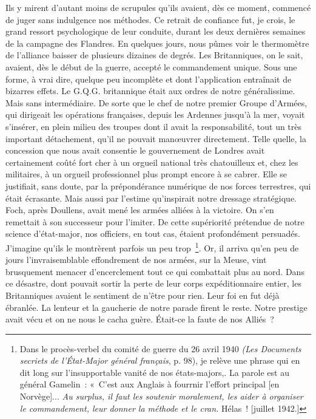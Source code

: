 \documentclass[french,twoside]{book} %
\begin{document}
Ils y mirent d’autant moins de scrupules qu’ils avaient, dès ce moment, commencé de juger sans indulgence nos méthodes. Ce retrait de confiance fut, je crois, le grand ressort psychologique de leur conduite, durant les deux dernières semaines de la campagne des Flandres. En quelques jours, nous pûmes voir le thermomètre de l’alliance baisser de   plusieurs dizaines de degrés. Les Britanniques, on le sait, avaient, dès le début de la guerre, accepté le commandement unique. Sous une forme, à vrai dire, quelque peu incomplète et dont l’application entraînait de bizarres effets. Le G.Q.G. britannique était aux ordres de notre généralissime. Mais sans intermédiaire. De sorte que le chef de notre premier Groupe d’Armées, qui dirigeait les opérations françaises, depuis les Ardennes jusqu’à la mer, voyait s’insérer, en plein milieu des troupes dont il avait la responsabilité, tout un très important détachement, qu’il ne pouvait manœuvrer directement. Telle quelle, la concession que nous avait consentie le gouvernement de Londres avait certainement coûté fort cher à un orgueil national très chatouilleux et, chez les militaires, à un orgueil professionnel plus prompt encore à se cabrer. Elle se justifiait, sans doute, par la prépondérance numérique de nos forces terrestres, qui était écrasante. Mais aussi par l’estime qu’inspirait notre dressage stratégique. Foch, après Doullens, avait mené les armées alliées à la victoire. On s’en remettait à son successeur pour l’imiter. De cette supériorité prétendue de notre science d’état-major, nos officiers, en tout cas, étaient profondément persuadés. J’imagine qu’ils le montrèrent parfois un peu trop \footnote{ Dans le procès-verbel du comité de guerre du 26 avril 1940 \emph{(Les Documents secriets de l’État-Major général français}, p. 98), je relève une phrase qui en dit long sur l’insupportable vanité de nos états-majors,. La parole est au général Gamelin : « C’est aux Anglais à fourrnir l’effort principal [en Norvège]... \emph{Au surplus, il faut les soutenir moralement, les aider à organiser le commandement, leur donner la méthode et le cran.} Hélas ! [juillet 1942.]}. Or, il arriva qu’en peu de jours l’invraisemblable effondrement de nos armées, sur la Meuse, vint brusquement menacer d’encerclement tout ce qui combattait plus au nord. Dans ce désastre, dont pouvait sortir la perte de leur corps   expéditionnaire entier, les Britanniques avaient le sentiment de n’être pour rien. Leur foi en fut déjà ébranlée. La lenteur et la gaucherie de notre parade firent le reste. Notre prestige avait vécu et on ne nous le cacha guère. Était-ce la faute de nos Alliés ?\par
\end{document}
